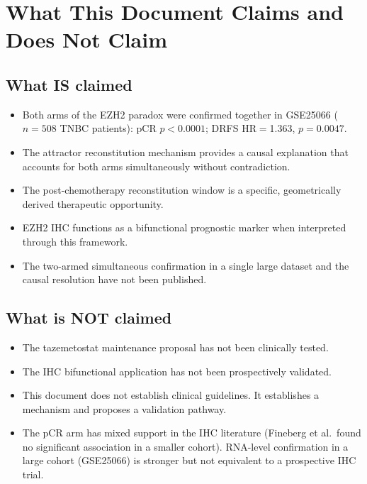 \documentclass[12pt, a4paper]{article}
\begin{document}
\section{What This Document Claims and Does Not Claim}

\subsection{What IS claimed}

\begin{itemize}
    \item Both arms of the EZH2 paradox were
    confirmed together in GSE25066 ($n = 508$
    TNBC patients): pCR $p < 0.0001$;
    DRFS HR$=$1.363, $p = 0.0047$.
    \item The attractor reconstitution mechanism
    provides a causal explanation that accounts
    for both arms simultaneously without
    contradiction.
    \item The post-chemotherapy reconstitution
    window is a specific, geometrically derived
    therapeutic opportunity.
    \item EZH2 IHC functions as a bifunctional
    prognostic marker when interpreted through
    this framework.
    \item The two-armed simultaneous confirmation
    in a single large dataset and the causal
    resolution have not been published.
\end{itemize}

\subsection{What is NOT claimed}

\begin{itemize}
    \item The tazemetostat maintenance proposal
    has not been clinically tested.
    \item The IHC bifunctional application has
    not been prospectively validated.
    \item This document does not establish clinical
    guidelines. It establishes a mechanism and
    proposes a validation pathway.
    \item The pCR arm has mixed support in the IHC
    literature (Fineberg et al.\ found no
    significant association in a smaller cohort).
    RNA-level confirmation in a large cohort
    (GSE25066) is stronger but not equivalent
    to a prospective IHC trial.
\end{itemize}
\end{document}

